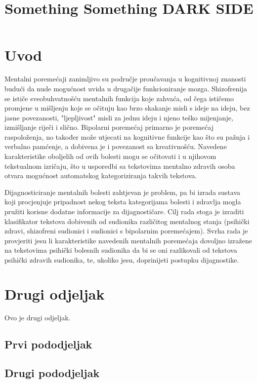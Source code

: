\documentclass[10pt, a4paper]{article}
\title{Something Something DARK SIDE}
\begin{document}
\maketitleabstract

\section{Uvod}

Mentalni poremećaji zanimljivo su područje proučavanja u kognitivnoj znanosti budući da nude mogućnost uvida u drugačije funkcioniranje mozga. Shizofrenija se ističe sveobuhvatnošću mentalnih funkcija koje zahvaća, od čega ističemo promjene u mišljenju koje se očituju kao brzo skakanje misli s ideje na ideju, bez jasne povezanosti, "ljepljivost" misli za jednu ideju i njeno teško mijenjanje, izmišljanje riječi i slično. Bipolarni poremećaj primarno je poremećaj raspoloženja, no također može utjecati na kognitivne funkcije kao što su pažnja i verbalno pamćenje, a dobivena je i povezanost sa kreativnošću. Navedene karakteristike oboljelih od ovih bolesti mogu se očitovati i u njihovom tekstualnom izričaju, što u usporedbi sa tekstovima mentalno zdravih osoba otvara mogućnost automatskog kategoriziranja takvih tekstova. 

Dijagnosticiranje mentalnih bolesti zahtjevan je problem, pa bi izrada sustava koji procjenjuje pripadnost nekog teksta kategorijama bolesti i zdravlja mogla pružiti korisne dodatne informacije za dijagnostičare. Cilj rada stoga je izraditi klasifikator tekstova dobivenih od sudionika različitog mentalnog stanja (psihički zdravi, shizofreni sudionici i sudionici s bipolarnim poremećajem). Svrha rada je provjeriti jesu li karakteristike navedenih mentalnih poremećaja dovoljno izražene na tekstovima psihički bolesnih sudionika da bi se oni razlikovali od tekstova psihički zdravih sudionika, te, ukoliko jesu, doprinijeti postupku dijagnostike.

\section{Drugi odjeljak}

Ovo je drugi odjeljak.

\subsection{Prvi pododjeljak}
\label{sec:prvi}



\subsection{Drugi pododjeljak}
\end{document}
